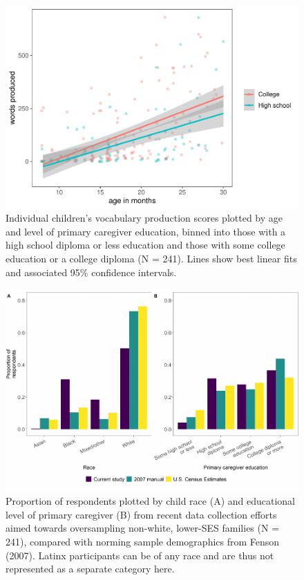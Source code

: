 \documentclass[
  english,
  ,man,floatsintext]{apa6}
\begin{document}
\begin{figure}
\centering
\includegraphics{webcdi_paper_files/figure-latex/momedses-1.pdf}
\caption{\label{fig:momedses}Individual children's vocabulary production scores plotted by age and level of primary caregiver education, binned into those with a high school diploma or less education and those with some college education or a college diploma (N = 241). Lines show best linear fits and associated 95\% confidence intervals.}
\end{figure}

\begin{figure}
\centering
\includegraphics{webcdi_paper_files/figure-latex/demobarses-1.pdf}
\caption{\label{fig:demobarses}Proportion of respondents plotted by child race (A) and educational level of primary caregiver (B) from recent data collection efforts aimed towards oversampling non-white, lower-SES families (N = 241), compared with norming sample demographics from Fenson (2007). Latinx participants can be of any race and are thus not represented as a separate category here.}
\end{figure}
\end{document}
